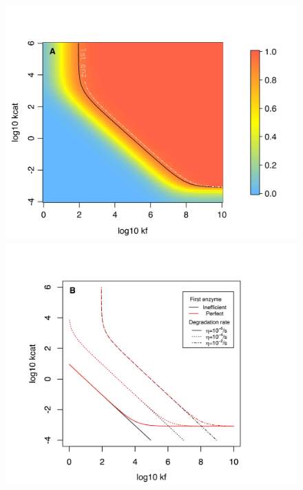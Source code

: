 \begin{figure}[t!]
\centering
\begin{minipage}[c]{0.48\linewidth}
\includegraphics[scale=0.625,trim=0cm 0cm 0cm 1.5cm,clip]{pics/Enzymes/2DFitLandscape_etahigh_noreverse.jpeg} 
\end{minipage} \hfill
\begin{minipage}[c]{0.48\linewidth}
\includegraphics[scale=0.625,trim=0cm 0cm 0cm 1.5cm,clip]{pics/Enzymes/2DFit_Landscape_2Enz_First_Enz_Influence.jpeg} 

\end{minipage}
\end{figure}
